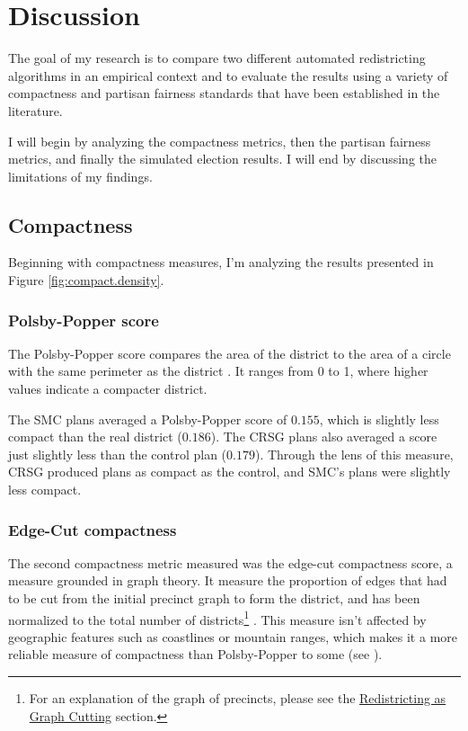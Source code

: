 \section{Discussion}

The goal of my research is to compare two different automated redistricting algorithms in an empirical context and to evaluate the results using a variety of compactness and partisan fairness standards that have been established in the literature. 

I will begin by analyzing the compactness metrics, then the partisan fairness metrics, and finally the simulated election results. I will end by discussing the limitations of my findings. 

\subsection{Compactness}

Beginning with compactness measures, I'm analyzing the results presented in Figure \ref{fig:compact.density}. 

\subsubsection{Polsby-Popper score}

The Polsby-Popper score compares the area of the district to the area of a circle with the same perimeter as the district \parencite{polsby1991}. It ranges from 0 to 1, where higher values indicate a compacter district. 

The SMC plans averaged a Polsby-Popper score of $0.155$, which is slightly less compact than the real district ($0.186$). The CRSG plans also averaged a score just slightly less than the control plan ($0.179$). Through the lens of this measure, CRSG produced plans as compact as the control, and SMC's plans were slightly less compact. 

\subsubsection{Edge-Cut compactness}

The second compactness metric measured was the edge-cut compactness score, a measure grounded in graph theory. It measure the proportion of edges that had to be cut from the initial precinct graph to form the district, and has been normalized to the total number of districts\footnote{For an explanation of the graph of precincts, please see the \hyperref[sec:redistasgraphcut]{Redistricting as Graph Cutting} section.} \parencite{dube2016}. This measure isn't affected by geographic features such as coastlines or mountain ranges, which makes it a more reliable measure of compactness than Polsby-Popper to some (see \textcite{mccartan2020}). 

